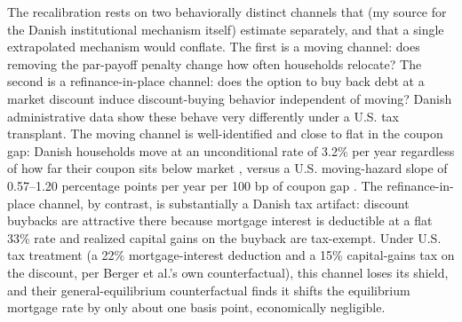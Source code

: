\documentclass[12pt]{article}
\begin{document}
The recalibration rests on two behaviorally distinct channels that \citet{berger2026} (my source for the Danish institutional mechanism itself) estimate separately, and that a single extrapolated mechanism would conflate. The first is a moving channel: does removing the par-payoff penalty change how often households relocate? The second is a refinance-in-place channel: does the option to buy back debt at a market discount induce discount-buying behavior independent of moving? Danish administrative data show these behave very differently under a U.S. tax transplant. The moving channel is well-identified and close to flat in the coupon gap: Danish households move at an unconditional rate of 3.2\% per year regardless of how far their coupon sits below market \citep[\S3.3.1, structural parameters in tab.~3]{berger2026}, versus a U.S. moving-hazard slope of 0.57--1.20 percentage points per year per 100 bp of coupon gap \citep{fonseca2024}. The refinance-in-place channel, by contrast, is substantially a Danish tax artifact: discount buybacks are attractive there because mortgage interest is deductible at a flat 33\% rate and realized capital gains on the buyback are tax-exempt. Under U.S. tax treatment (a 22\% mortgage-interest deduction and a 15\% capital-gains tax on the discount, per Berger et al.'s own counterfactual), this channel loses its shield, and their general-equilibrium counterfactual \citep[\S4.9.1]{berger2026} finds it shifts the equilibrium mortgage rate by only about one basis point, economically negligible.
\end{document}
